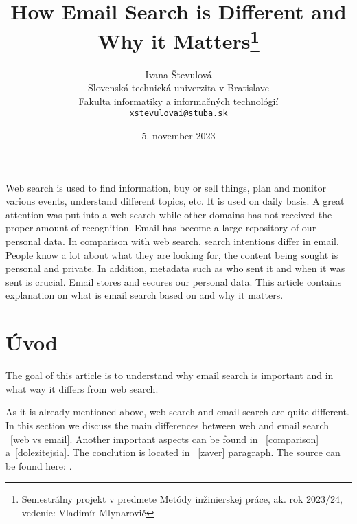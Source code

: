 \documentclass[10pt,twoside,slovak,a4paper]{article}
\title{ How Email Search is Different and Why it Matters\thanks{Semestrálny projekt v predmete Metódy inžinierskej práce, ak. rok 2023/24, vedenie: Vladimír Mlynarovič}} %
\author{Ivana Števulová\\[2pt]
	{\small Slovenská technická univerzita v Bratislave}\\
	{\small Fakulta informatiky a informačných technológií}\\
	{\small \texttt{xstevulovai@stuba.sk}}
	}
\date{\small 5. november 2023}%
\begin{document}
\maketitle

\begin{abstract}

\end{abstract}

Web search is used to find information, buy or sell things, plan and monitor various events, understand different topics, etc. It is used on daily basis. A great attention was put into a web search while other domains has not received the proper amount of recognition. Email has become a large repository of our personal data. In comparison with web search, search intentions differ in email. People know a lot about what they are looking for, the content being sought is personal and private. In addition, metadata such as who sent it and when it was sent is crucial. Email stores and secures our personal data. This article contains explanation on what is email search based on and why it matters. 


\section{Úvod}

The goal of this article is to understand why email search is important and in what way it differs from web search.

As it is already mentioned above, web search and email search are quite different. In this section we discuss the main differences between web and email search ~\ref{web vs email}.
Another important aspects can be found in ~\ref{comparison} a~\ref{dolezitejsia}.
The conclution is located in ~\ref{zaver} paragraph.
The source can be found here: \cite{DBLP:conf/wsdm/Dumais21}.






\end{document}
